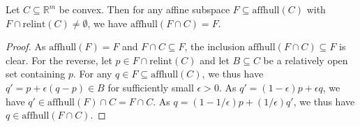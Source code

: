 \documentclass[anon,12pt]{colt2021} %
\newcommand{\Comments}{1}
\newcommand{\mynote}[2]{\ifnum\Comments=1\textcolor{#1}{#2}\fi}
\newcommand{\bo}[1]{\mynote{blue}{[Bo: #1]}}
\newcommand{\reals}{\mathbb{R}}
\newcommand{\relint}[1]{\mathrm{relint}(#1)}
\newcommand{\affhull}{\mathrm{affhull}}
\begin{document}
\begin{lemma}\label{lem:affhull-relint}
	Let $C\subseteq\reals^m$ be convex.
	Then for any affine subspace $F\subseteq\affhull(C)$ with $F\cap\relint C \neq \emptyset$, we have $\affhull(F\cap C) = F$.
\end{lemma}
\begin{proof}
	As $\affhull(F) = F$ and $F\cap C\subseteq F$, the inclusion $\affhull(F\cap C) \subseteq F$ is clear.
	For the reverse, let $p\in F\cap\relint C$ and let $B\subseteq C$ be a relatively open set containing $p$.
	For any $q\in F \subseteq \affhull(C)$, we thus have $q' = p + \epsilon (q-p) \in B$ for sufficiently small $\epsilon > 0$.
	As $q' = (1-\epsilon) p + \epsilon q$, we have $q' \in \affhull(F)\cap C = F\cap C$.
	As $q = (1-1/\epsilon) p + (1/\epsilon) q'$, we thus have $q\in\affhull(F\cap C)$.
\end{proof}
\end{document}

